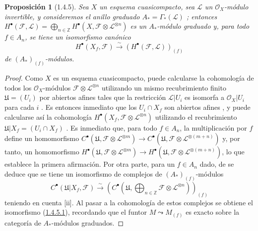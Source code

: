 \documentclass[10pt,oneside,openany]{book}
\theoremstyle{egaenv}\newtheorem*{env}{---}
\theoremstyle{egastatement}
\newtheorem*{proposition}{Proposición}
\theoremstyle{egadescription}
\newcommand{\oldpage}[2][]{\marginnote{\normalfont\scriptsize\textbf{#1}\,|\,#2}\ignorespaces}
\begin{document}
\begin{proposition}[1.4.5]
\label{III.1.4.5}
\label{III.1.4.5-fr}
\oldpage[III]{90}
Sea $X$ un esquema cuasicompacto, sea $\mathcal L$ un $\mathcal O_X$-módulo invertible, y consideremos el anillo graduado $A_*=\Gamma_*(\mathcal L)$ ; entonces $H^\bullet(\mathcal F,\mathcal L)
=\bigoplus_{n\in\mathbb Z}H^\bullet(X,\mathcal F\otimes\mathcal L^{\otimes n})$ es un $A_*$-módulo graduado y, para todo $f\in A_n$, se tiene un isomorfismo canónico
\begin{equation}
\label{III.1.4.5.1-fr}
\tag{1.4.5.1}
H^\bullet(X_f,\mathcal F)
\xrightarrow{\sim}(H^\bullet(\mathcal F,\mathcal L))_{(f)}
\end{equation}
de $(A_*)_{(f)}$-módulos.
\end{proposition}

\begin{proof}
Como $X$ es un esquema cuasicompacto, puede calcularse la cohomología de todos los $\mathcal O_X$-módulos $\mathcal F\otimes\mathcal L^{\otimes n}$ utilizando un mismo recubrimiento finito $\mathfrak U=(U_i)$ por abiertos afines tales que la restricción
$\mathcal L\vert U_i$ es isomorfa a $\mathcal O_X\vert U_i$ para cada
$i$ .
Es entonces inmediato que los $U_i\cap X_f$ son abiertos afines , y puede calcularse así la cohomología $H^\bullet(X_f,\mathcal F\otimes\mathcal L^{\otimes n})$ utilizando el recubrimiento $\mathfrak U\vert X_f=(U_i\cap X_f)$ .
Es inmediato que, para todo $f\in A_n$, la multiplicación por $f$ define un homomorfismo $C^\bullet(\mathfrak U,\mathcal F\otimes\mathcal L^{\otimes m})
\longrightarrow
C^\bullet(\mathfrak U,\mathcal F\otimes\mathcal L^{\otimes(m+n)})$ y, por tanto, un homomorfismo $H^\bullet(\mathfrak U,\mathcal F\otimes\mathcal L^{\otimes m})
\longrightarrow
H^\bullet(\mathfrak U,\mathcal F\otimes\mathcal L^{\otimes(m+n)})$, lo que establece la primera afirmación.
Por otra parte, para un $f\in A_n$ dado, de  se deduce que se tiene un isomorfismo de complejos de $(A_*)_{(f)}$-módulos
\[
C^\bullet(\mathfrak U\vert X_f,\mathcal F)
\xrightarrow{\sim}
\left(C^\bullet\left(\mathfrak U,
\bigoplus_{n\in\mathbb Z}\mathcal F\otimes\mathcal L^{\otimes n}
\right)\right)_{(f)}
\]
teniendo en cuenta [ii].
Al pasar a la cohomología de estos complejos se obtiene el isomorfismo (\hyperref[III.1.4.5.1]{1.4.5.1}), recordando que el funtor $M\leadsto M_{(f)}$ es exacto sobre la categoría de $A_*$-módulos graduados.
\end{proof}
\end{document}

